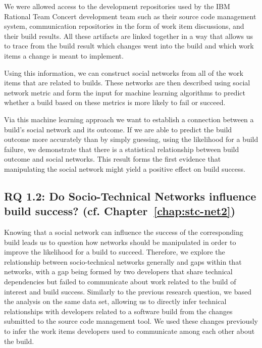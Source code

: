 We were allowed access to the development repositories used by the IBM Rational Team Concert development team such as their source code management system, communication repositories in the form of work item discussions, and their build results.
All these artifacts are linked together in a way that allows us to trace from the build result which changes went into the build and which work items a change is meant to implement.

Using this information, we can construct social networks from all of the work items that are related to builds.
These networks are then described using social network metric and form the input for machine learning algorithms to predict whether a build based on these metrics is more likely to fail or succeed.

Via this machine learning approach we want to establish a connection between a build's social network and its outcome. 
If we are able to predict the build outcome more accurately than by simply guessing, using the likelihood for a build failure, we demonstrate that there is a statistical relationship between build outcome and social networks.
This result forms the first evidence that manipulating the social network might yield a positive effect on build success.

\subsection{%
  RQ 1.2: Do Socio-Technical Networks influence build success? (cf. Chapter~\ref{chap:stc-net2})}

Knowing that a social network can influence the success of the corresponding build leads us to question how networks should be manipulated in order to improve the likelihood for a build to succeed.
Therefore, we explore the relationship between socio-technical networks generally and gaps within that networks, with a gap being formed by two developers that share technical dependencies but failed to communicate about work related to the build of interest and build success.
Similarly to the previous research question, we based the analysis on the same data set, allowing us to directly infer technical relationships with developers related to a software build from the changes submitted to the source code management tool.
We used these changes previously to infer the work items developers used to communicate among each other about the build.

